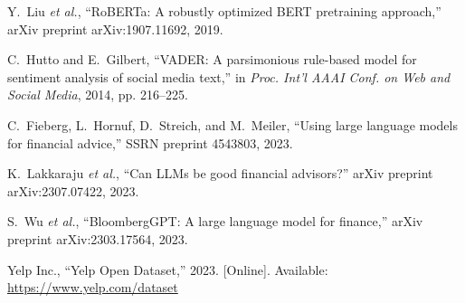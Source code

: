 \documentclass[conference]{IEEEtran}
\begin{document}
\begin{thebibliography}{00}
Y.~Liu \emph{et al.}, ``RoBERTa: A robustly optimized BERT pretraining approach,'' arXiv preprint arXiv:1907.11692, 2019.

C.~Hutto and E.~Gilbert, ``VADER: A parsimonious rule-based model for sentiment analysis of social media text,'' in \emph{Proc. Int’l AAAI Conf. on Web and Social Media}, 2014, pp. 216--225.

C.~Fieberg, L.~Hornuf, D.~Streich, and M.~Meiler, ``Using large language models for financial advice,'' SSRN preprint 4543803, 2023.

K.~Lakkaraju \emph{et al.}, ``Can LLMs be good financial advisors?'' arXiv preprint arXiv:2307.07422, 2023.

S.~Wu \emph{et al.}, ``BloombergGPT: A large language model for finance,'' arXiv preprint arXiv:2303.17564, 2023.

Yelp Inc., ``Yelp Open Dataset,'' 2023. [Online]. Available: \url{https://www.yelp.com/dataset}

\end{thebibliography}
\end{document}
